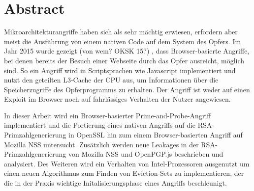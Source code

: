 \chapter*{Abstract}


Mikroarchitekturangriffe haben sich als sehr mächtig erwiesen, erfordern aber meist die Ausführung von einem nativen Code auf dem System des Opfers.
Im Jahr 2015 wurde gezeigt (von wem? OKSK 15?)  \cite{TheSpyInTheSandbox}, dass Browser-basierte Angriffe, bei denen bereits der Besuch einer Webseite durch das Opfer ausreicht, möglich sind.
So ein Angriff wird in Scriptsprachen wie Javascript implementiert und nutzt den geteilten L3-Cache der CPU aus, um Informationen über die Speicherzugriffe des Opferprogramms zu erhalten.
Der Angriff ist weder auf einen Exploit im Browser noch auf fahrlässiges Verhalten der Nutzer angewiesen.




In dieser Arbeit wird ein Browser-basierter Prime-and-Probe-Angriff implementiert und die Portierung eines nativen Angriffs auf die RSA-Primzahlgenerierung \cite{RSAKeyGeneration2} in OpenSSL hin zum einem Browser-basierten Angriff auf Mozilla NSS untersucht.
Zusätzlich werden neue Leakages in der RSA-Primzahlgenerierung von Mozilla NSS und OpenPGP.js beschrieben und analysiert.
Des Weiteren wird ein Verhalten von Intel-Prozessoren ausgenutzt um einen neuen Algorithmus zum Finden von Eviction-Sets zu implementieren, der die in der Praxis wichtige Initalisierungsphase eines Angriffs beschleunigt. 

